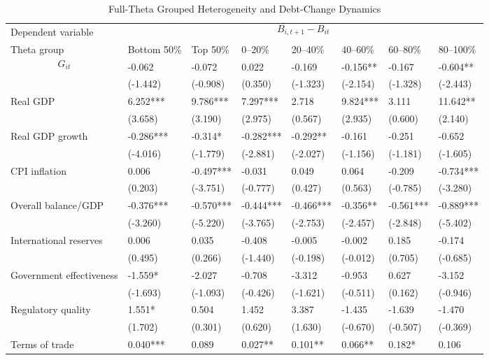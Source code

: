 \begin{table}[H]\centering
\begin{threeparttable}
\caption{Full-Theta Grouped Heterogeneity and Debt-Change Dynamics}
\label{tab:theta_group_heterogeneity_debt}
\scriptsize
\begin{tabularx}{\textwidth}{lYYYYYYY}
\toprule
Dependent variable &  \\
\cmidrule(lr){2-8}
Theta group & Bottom 50\% & Top 50\% & 0--20\% & 20--40\% & 40--60\% & 60--80\% & 80--100\% \\
\midrule
$$G_{it}$$ & -0.062 & -0.072 & 0.022 & -0.169 & -0.156** & -0.167 & -0.604** \\
  & (-1.442) & (-0.908) & (0.350) & (-1.323) & (-2.154) & (-1.328) & (-2.443) \\
Real GDP & 6.252*** & 9.786*** & 7.297*** & 2.718 & 9.824*** & 3.111 & 11.642** \\
  & (3.658) & (3.190) & (2.975) & (0.567) & (2.935) & (0.600) & (2.140) \\
Real GDP growth & -0.286*** & -0.314* & -0.282*** & -0.292** & -0.161 & -0.251 & -0.652 \\
  & (-4.016) & (-1.779) & (-2.881) & (-2.027) & (-1.156) & (-1.181) & (-1.605) \\
CPI inflation & 0.006 & -0.497*** & -0.031 & 0.049 & 0.064 & -0.209 & -0.734*** \\
  & (0.203) & (-3.751) & (-0.777) & (0.427) & (0.563) & (-0.785) & (-3.280) \\
Overall balance/GDP & -0.376*** & -0.570*** & -0.444*** & -0.466*** & -0.356** & -0.561*** & -0.889*** \\
  & (-3.260) & (-5.220) & (-3.765) & (-2.753) & (-2.457) & (-2.848) & (-5.402) \\
International reserves & 0.006 & 0.035 & -0.408 & -0.005 & -0.002 & 0.185 & -0.174 \\
  & (0.495) & (0.266) & (-1.440) & (-0.198) & (-0.012) & (0.705) & (-0.685) \\
Government effectiveness & -1.559* & -2.027 & -0.708 & -3.312 & -0.953 & 0.627 & -3.152 \\
  & (-1.693) & (-1.093) & (-0.426) & (-1.621) & (-0.511) & (0.162) & (-0.946) \\
Regulatory quality & 1.551* & 0.504 & 1.452 & 3.387 & -1.435 & -1.639 & -1.470 \\
  & (1.702) & (0.301) & (0.620) & (1.630) & (-0.670) & (-0.507) & (-0.369) \\
Terms of trade & 0.040*** & 0.089 & 0.027** & 0.101** & 0.066** & 0.182* & 0.106 \\

\end{tabularx}
\end{threeparttable}
\end{table}
